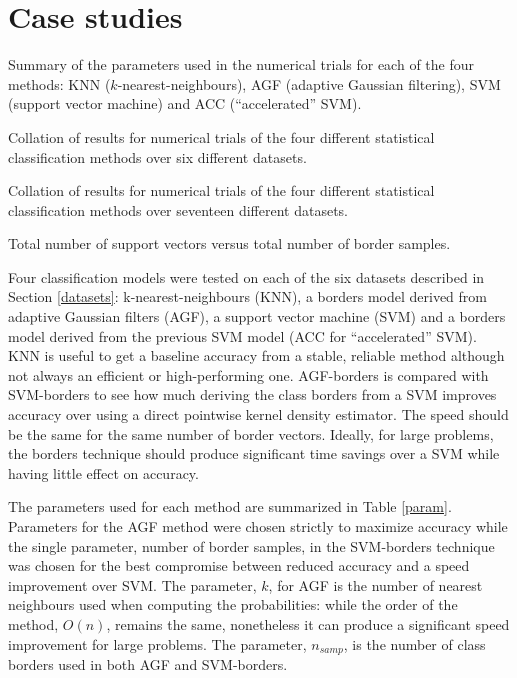 \documentclass[11pt]{article}
\begin{document}
\section{Case studies}

\begin{table}
	\caption{Summary of the parameters used in the numerical trials for each of the four methods: KNN ($k$-nearest-neighbours), AGF (adaptive Gaussian filtering), SVM (support vector machine) and ACC (``accelerated'' SVM).}
	\label{param}
	
\end{table}

\begin{table}
	{\small
		
	}
	\caption{Collation of results for numerical trials of the four different statistical classification methods over six different datasets.}
\end{table}

\begin{table}
	{\small
		
	}
	\caption{Collation of results for numerical trials of the four different statistical classification methods over seventeen different datasets.}
\end{table}

\begin{table}
	\caption{Total number of support vectors versus total number of border samples.}
	
\end{table}

Four classification models were tested on each of the six datasets described in
Section \ref{datasets}: k-nearest-neighbours (KNN), a borders model derived from
adaptive Gaussian filters (AGF), a support vector machine (SVM) and a borders
model derived from the previous SVM model (ACC for ``accelerated'' SVM).
KNN is useful to get a baseline accuracy from a stable, reliable method although
not always an efficient or high-performing one.
AGF-borders is compared with SVM-borders to see how much deriving the class borders
from a SVM improves accuracy over using a direct pointwise kernel density estimator.
The speed should be the same for the same number of border vectors.
Ideally, for large problems, the borders technique should produce significant time
savings over a SVM while having little effect on accuracy.

The parameters used for each method are summarized in Table \ref{param}.
Parameters for the AGF method were chosen strictly to maximize accuracy while
the single parameter, number of border samples, in the SVM-borders technique
was chosen for the best compromise between reduced accuracy and a speed
improvement over SVM. The parameter, $k$, for AGF is the number of nearest
neighbours used when computing the probabilities: 
while the order of the method, $O(n)$, remains the same, nonetheless it can produce a significant speed improvement for large problems.
The parameter, $n_{samp}$, is the number of class borders used in both 
AGF and SVM-borders.
\end{document}

